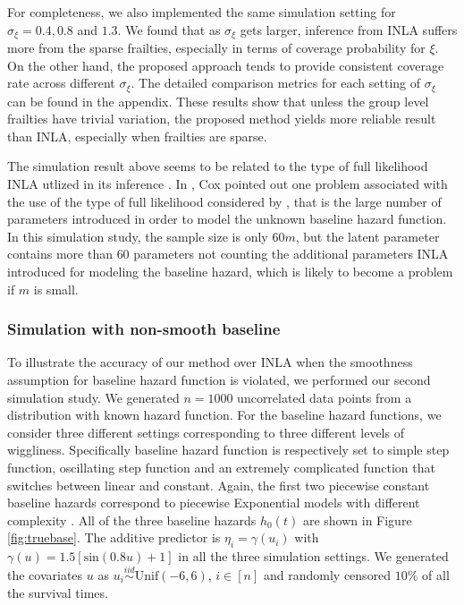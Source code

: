 \documentclass[ba]{imsart}
\begin{document}
For completeness, we also implemented the same simulation setting for $\sigma_\xi = 0.4, 0.8$ and $1.3$. We found that as $\sigma_\xi$ gets larger, inference from INLA suffers more from the sparse frailties, especially in terms of coverage probability for $\xi$. On the other hand, the proposed approach tends to provide consistent coverage rate across different $\sigma_\xi$. The detailed comparison metrics for each setting of $\sigma_\xi$ can be found in the appendix. These results show that unless the group level frailties have trivial variation, the proposed method yields more reliable result than INLA, especially when frailties are sparse.

The simulation result above seems to be related to the type of full likelihood INLA utlized in its inference \citep{inlacoxph}. In \cite{coxdiscussion}, Cox pointed out one problem associated with the use of the type of full likelihood considered by \cite{inlacoxph}, that is the large number of parameters introduced in order to model the unknown baseline hazard function. In this simulation study, the sample size is only $60m$, but the latent parameter contains more than $60$ parameters not counting the additional parameters INLA introduced for modeling the baseline hazard, which is likely to become a problem if $m$ is small. 




\subsubsection{Simulation with non-smooth baseline}\label{subsubsec:sim2}

To illustrate the accuracy of our method over INLA when the smoothness assumption for baseline hazard function is violated, we performed our second simulation study. We generated $n = 1000$ uncorrelated data points from a distribution with known hazard function. For the baseline hazard functions, we consider three different settings corresponding to three different levels of wiggliness. Specifically baseline hazard function is respectively set to simple step function, oscillating step function and an extremely complicated function that switches between linear and constant. Again, the first two piecewise constant baseline hazards correspond to piecewise Exponential models with different complexity \citep{piecewiseExp}. All of the three baseline hazards $h_{0}(t)$ are shown in Figure \ref{fig:truebase}. The additive predictor is $\eta_{i} = \gamma\left(u_{i}\right)$ with $\gamma(u) = 1.5 [ \text{sin}(0.8u) + 1 ]$ in all the three simulation settings. We generated the covariates $u$ as  $u_{i}\overset{iid}{\sim}\text{Unif}(-6,6)$, $i \in [n]$ and randomly censored $10\%$ of all the survival times.
\end{document}
